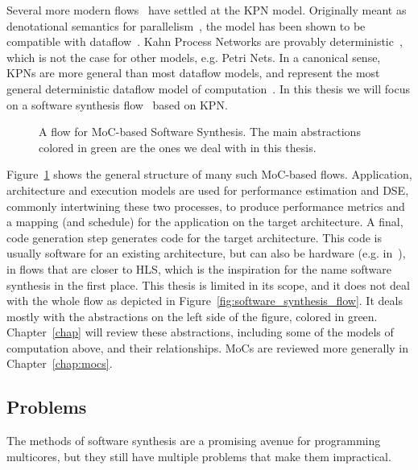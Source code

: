 Several more modern flows~\cite{thiele2007DOL,maps,pimentel2006systematic,kangas2006uml} have settled at the \ac{KPN} model.
Originally meant as denotational semantics for parallelism~\cite{kahn74}, the model has been shown to be compatible with dataflow~\cite{lee1995dataflow}.
Kahn Process Networks are provably deterministic~\cite{kahn74}, which is not the case for other models, e.g. Petri Nets.
In a canonical sense, \acp{KPN} are more general than most dataflow models, and represent the most general deterministic dataflow model of computation~\cite{lee_matsikoudis_semantics}.
In this thesis we will focus on a software synthesis flow~\cite{maps,castrillon2014thesis} based on \ac{KPN}.

\begin{figure}[h]
	\centering
   \resizebox{0.95\textwidth}{!}{}
   \caption{A flow for \ac{MoC}-based Software Synthesis. The main abstractions colored in green are the ones we deal with in this thesis. } 
	\label{fig:software_synthesis_flows}
\end{figure}

Figure~\ref{fig:software_synthesis_flows} shows the general structure of many such \ac{MoC}-based flows. 
Application, architecture and execution models are used for performance estimation and \ac{DSE}, commonly intertwining these two processes, to produce performance metrics and a mapping (and schedule) for the application on the target architecture.
A final, code generation step generates code for the target architecture. This code is usually software for an existing architecture, but can also be hardware (e.g. in~\cite{haubelt2008systemcodesigner}), in flows that are closer to \ac{HLS}, which is the inspiration for the name software synthesis in the first place.
This thesis is limited in its scope, and it does not deal with the whole flow as depicted in Figure~\ref{fig:software_synthesis_flow}.
It deals mostly with the abstractions on the left side of the figure, colored in green.
Chapter~\ref{chap} will review these abstractions, including some of the models of computation above, and their relationships. \acp{MoC} are reviewed more generally in Chapter~\ref{chap:mocs}.

\subsection{Problems}

The methods of software synthesis are a promising avenue for programming multicores, but they still have multiple problems that make them impractical.



